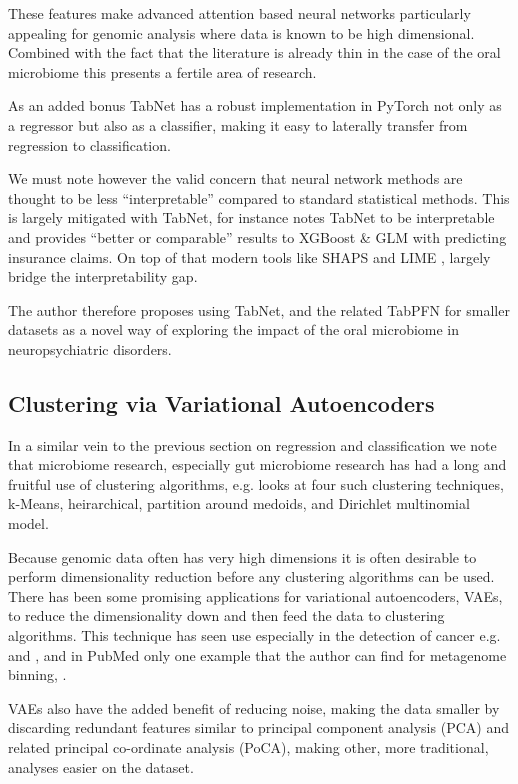 \documentclass{article}
\begin{document}
\begin{multicols}{2}
These features make advanced attention based neural networks particularly appealing for genomic analysis where data is known to be high dimensional. Combined with the fact that the literature is already thin in the case of the oral microbiome this presents a fertile area of research. 

As an added bonus TabNet has a robust implementation in PyTorch \cite{noauthor_pytorch-tabnet_nodate} not only as a regressor but also as a classifier, making it easy to laterally transfer from regression to classification.

We must note however the valid concern that neural network methods are thought to be less ``interpretable'' compared to standard statistical methods. This is largely mitigated with TabNet, for instance \cite{MCDONNELL2023119543} notes TabNet to be interpretable and provides ``better or comparable'' results to XGBoost \& GLM with predicting insurance claims. On top of that modern tools like SHAPS \cite{lundberg_unified_2017} and LIME \cite{10.1145/2939672.2939778}, largely bridge the interpretability gap.

The author therefore proposes using TabNet, and the related TabPFN \cite{hollmann2022tabpfn} for smaller datasets as a novel way of exploring the impact of the oral microbiome in neuropsychiatric disorders.
\subsection{Clustering via Variational Autoencoders}
In a similar vein to the previous section on regression and classification we note that microbiome research, especially gut microbiome research has had a long and fruitful use of clustering algorithms, e.g. \cite{shi_performance_2022} looks at four such clustering techniques, k-Means, heirarchical, partition around medoids, and Dirichlet multinomial model. 

Because genomic data often has very high dimensions it is often desirable to perform dimensionality reduction before any clustering algorithms can be used. There has been some promising applications for variational autoencoders, VAEs, to reduce the dimensionality down and then feed the data to clustering algorithms. This technique has seen use especially in the detection of cancer e.g. \cite{hira_integrated_2021} and \cite{8983228}, and in PubMed only one example that the author can find for metagenome binning, \cite{nissen_improved_2021}.

 VAEs also have the added benefit of reducing noise, making the data smaller by discarding redundant features similar to principal component analysis (PCA) and related principal co-ordinate analysis (PoCA), making other, more traditional, analyses easier on the dataset. 
 

\end{multicols}
\end{document}
